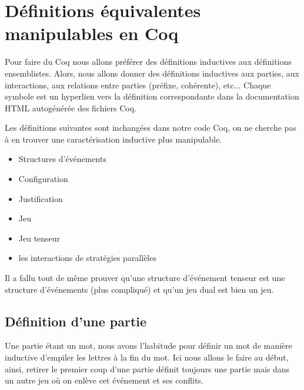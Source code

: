 \documentclass[a4paper,12pt]{article}
\begin{document}
\section{Définitions équivalentes manipulables en Coq}

Pour faire du Coq nous allons préférer des définitions inductives aux
définitions ensemblistes. Alors, nous allons donner des définitions inductives
aux parties, aux interactions, aux relations entre parties (préfixe, cohérente), etc...
Chaque symbole \faCode  est un hyperlien vers la définition correspondante dans la
documentation HTML autogénérée des fichiers Coq.

Les définitions suivantes sont inchangées dans notre code Coq, on ne cherche pas
à en trouver une caractérisation inductive plus manipulable.

\begin{itemize}
\item Structures d'événements \href{https://ulysse\_durand.gitlab.io/stagel3/Codecoq.theories.jeu.html\#EventStructure}{\faCode}
\item Configuration \href{https://ulysse\_durand.gitlab.io/stagel3/Codecoq.theories.jeu.html\#configuration}{\faCode}
\item Justification \href{https://ulysse\_durand.gitlab.io/stagel3/Codecoq.theories.jeu.html\#justifies}{\faCode}
\item Jeu \href{https://ulysse\_durand.gitlab.io/stagel3/Codecoq.theories.jeu.html\#Game}{\faCode}
\item Jeu tenseur \href{https://ulysse\_durand.gitlab.io/stagel3/Codecoq.theories.jeu.html\#Game_tenseur}{\faCode}
\item les interactions de stratégies parallèles \href{https://ulysse\_durand.gitlab.io/stagel3/Codecoq.theories.compose.html\#parallele_stratOO}{\faCode}
\end{itemize}

Il a fallu tout de même prouver qu'une structure d'événement tenseur est une
structure d'événements (plus compliqué) et qu'un jeu dual est bien un jeu.


\subsection{Définition d'une partie}

Une partie étant un mot, nous avons l'habitude pour définir un mot de manière
inductive d'empiler les lettres à la fin du mot. Ici nous allons le faire au
début, ainsi,  retirer le premier coup d'une partie définit toujours une
partie mais dans un autre jeu où on enlève cet événement et ses conflits.
\end{document}
